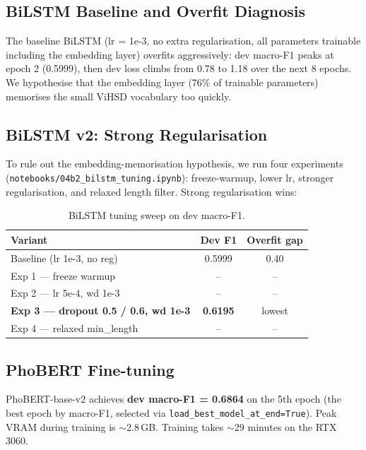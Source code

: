 \documentclass[a4paper,12pt,oneside]{report}
\begin{document}
\subsection{BiLSTM Baseline and Overfit Diagnosis}
\label{sec:bilstm-baseline}
The baseline BiLSTM (lr = 1e-3, no extra regularisation, all parameters
trainable including the embedding layer) overfits aggressively:
dev macro-F1 peaks at epoch 2 (0.5999), then dev loss climbs from 0.78 to
1.18 over the next 8 epochs. We hypothesise that the embedding layer
(76\% of trainable parameters) memorises the small ViHSD vocabulary too
quickly.

\subsection{BiLSTM v2: Strong Regularisation}
\label{sec:bilstm-v2}
To rule out the embedding-memorisation hypothesis, we run four
experiments (\texttt{notebooks/04b2\_bilstm\_tuning.ipynb}):
freeze-warmup, lower lr, stronger regularisation, and relaxed length
filter. Strong regularisation wins:

\begin{table}[H]
\centering
\caption{BiLSTM tuning sweep on dev macro-F1.}
\label{tab:bilstm-tuning}
\begin{tabular}{lcc}
\toprule
Variant & Dev F1 & Overfit gap \\ \midrule
Baseline (lr 1e-3, no reg)             & 0.5999 & 0.40 \\
Exp 1 --- freeze warmup                & --     & --   \\
Exp 2 --- lr 5e-4, wd 1e-3             & --     & --   \\
\textbf{Exp 3 --- dropout 0.5 / 0.6, wd 1e-3} & \textbf{0.6195} & lowest \\
Exp 4 --- relaxed min\_length          & --     & --   \\ \bottomrule
\end{tabular}
\end{table}


\subsection{PhoBERT Fine-tuning}
\label{sec:phobert-results}
PhoBERT-base-v2 achieves \textbf{dev macro-F1 = 0.6864} on the 5th
epoch (the best epoch by macro-F1, selected via
\texttt{load\_best\_model\_at\_end=True}). Peak VRAM during training is
$\sim$2.8\,GB. Training takes $\sim$29 minutes on the RTX 3060.
\end{document}
